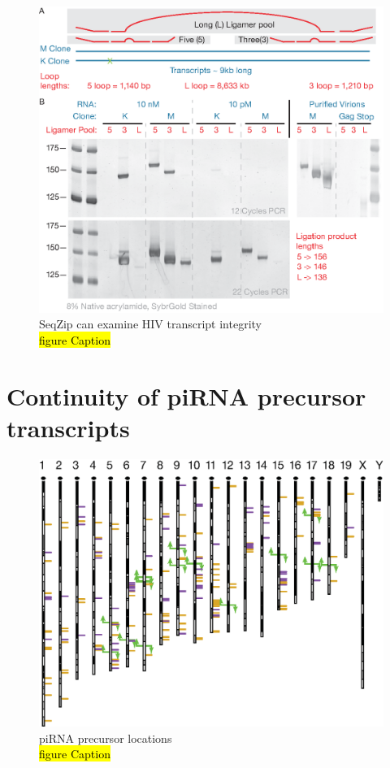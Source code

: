 	  \begin{figure}[htbp] %
  	  \centering 
	    \includegraphics{Figures/Chapter2/HIVviaSeqZip.eps}
    	\caption[SeqZip can examine HIV transcript integrity]
    	{
	      SeqZip can examine HIV transcript integrity\\
      	\hl{figure Caption}
    		}
    	\label{fig:Hiv tx via SeqZip}
  		\end{figure}

\section{Continuity of piRNA precursor transcripts}\label{sec: precursor TX}

  \begin{figure}[htbp] %
    \centering 
    \includegraphics{Figures/Chapter2/PrecursorLocations.eps}
    \caption[piRNA precursor locations]
    {
      piRNA precursor locations\\
      \hl{figure Caption}
   	 }
    \label{fig:Hiv tx via SeqZip}
 	 \end{figure}

